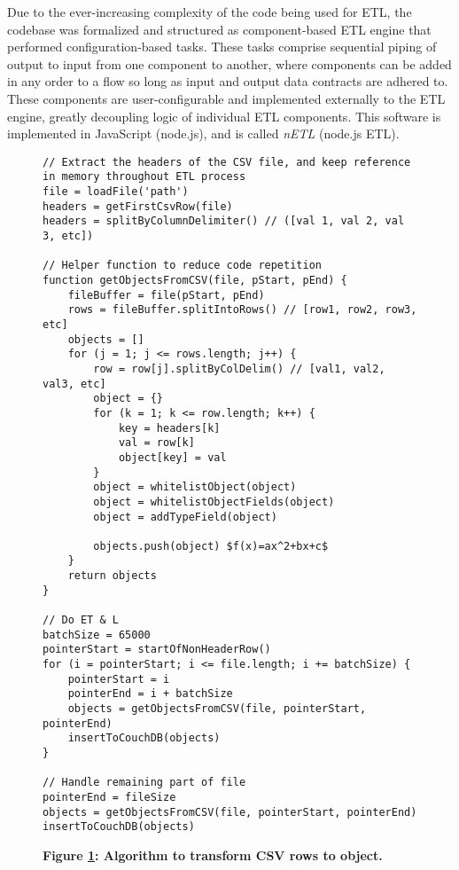 Due to the ever-increasing complexity of the code being used for ETL, the codebase was formalized and structured as component-based ETL engine that performed configuration-based tasks. These tasks comprise sequential piping of output to input from one component to another, where components can be added in any order to a flow so long as input and output data contracts are adhered to. These components are user-configurable and implemented externally to the ETL engine, greatly decoupling logic of individual ETL components. This software is implemented in JavaScript (node.js), and is called \textit{nETL} (node.js ETL).

\begin{figure}[H]
    \centering
    \begin{mdframed}
        \centering
        \begin{lstlisting}
// Extract the headers of the CSV file, and keep reference in memory throughout ETL process
file = loadFile('path')
headers = getFirstCsvRow(file)
headers = splitByColumnDelimiter() // ([val 1, val 2, val 3, etc])

// Helper function to reduce code repetition
function getObjectsFromCSV(file, pStart, pEnd) {
    fileBuffer = file(pStart, pEnd)
    rows = fileBuffer.splitIntoRows() // [row1, row2, row3, etc]
    objects = []
    for (j = 1; j <= rows.length; j++) {
        row = row[j].splitByColDelim() // [val1, val2, val3, etc]
        object = {}
        for (k = 1; k <= row.length; k++) {
            key = headers[k]
            val = row[k]
            object[key] = val
        }
        object = whitelistObject(object)
        object = whitelistObjectFields(object)
        object = addTypeField(object)

        objects.push(object) $f(x)=ax^2+bx+c$
    }
    return objects
}

// Do ET & L
batchSize = 65000
pointerStart = startOfNonHeaderRow()
for (i = pointerStart; i <= file.length; i += batchSize) {
    pointerStart = i
    pointerEnd = i + batchSize
    objects = getObjectsFromCSV(file, pointerStart, pointerEnd)
    insertToCouchDB(objects)
}

// Handle remaining part of file
pointerEnd = fileSize
objects = getObjectsFromCSV(file, pointerStart, pointerEnd)
insertToCouchDB(objects)
        \end{lstlisting}
    \end{mdframed}
    \caption[Row to object transformation]{\textbf{Figure \ref{row-object-transformation}: Algorithm to transform CSV rows to object.}}
    \label{row-object-transformation}
\end{figure}
